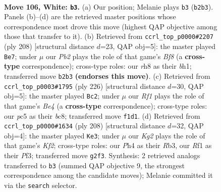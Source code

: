 \documentclass[11pt]{article}
\begin{document}
\clearpage

\begin{figure}[p]\centering
\begin{subfigure}{0.46\textwidth}\centering
\resizebox{\linewidth}{!}{%
\newchessgame
\chessboard[
  setfen={7r/2k5/p7/P1p2p1p/1p3P1P/4P1P1/1P4K1/5R2 w - - 23 106},
  showmover=false,
  pgfstyle=straightmove, color=movearrow, markmove={b2-b3}
]}
\caption{}
\end{subfigure}\hfill
\begin{subfigure}{0.46\textwidth}\centering
\resizebox{\linewidth}{!}{%
\newchessgame
\chessboard[
  setfen={5B2/5p1p/4p3/4PpP1/p4P2/P2k2P1/5K2/7b w - - 90 105},
  showmover=false,
  pgfstyle=straightmove, color=movearrow, markmove={f8-e7}
]}
\caption{}
\end{subfigure}
\\[4pt]
\begin{subfigure}{0.46\textwidth}\centering
\resizebox{\linewidth}{!}{%
\newchessgame
\chessboard[
  setfen={2b5/p4p2/1p1k2p1/7p/1P2BP1P/P3K1P1/8/8 w - - 55 114},
  showmover=false,
  pgfstyle=straightmove, color=movearrow, markmove={e4-c2}
]}
\caption{}
\end{subfigure}\hfill
\begin{subfigure}{0.46\textwidth}\centering
\resizebox{\linewidth}{!}{%
\newchessgame
\chessboard[
  setfen={8/2p5/3p2pk/3Pp1p1/2P1P3/1R3P1P/r4K2/8 w - - 27 105},
  showmover=false,
  pgfstyle=straightmove, color=movearrow, markmove={f2-e3}
]}
\caption{}
\end{subfigure}
\caption{\textbf{Move 106, White: \texttt{b3}.} (a) Our position; Melanie plays \texttt{b3} (\texttt{b2b3}). Panels (b)--(d) are the retrieved master positions whose correspondence most drove this move (highest QAP objective among those that transfer to it). (b) Retrieved from \texttt{ccrl\_top\_p0000\#2207} (ply 208) [structural distance $d$=23, QAP obj=5]: the master played \texttt{Be7}; under $\mu$ our \emph{Pb2} plays the role of that game's \emph{Bf8} (a \textbf{cross-type} correspondence); cross-type roles: our \emph{r}h8 as their \emph{b}h1; transferred move \texttt{b2b3} \textbf{(endorses this move)}. (c) Retrieved from \texttt{ccrl\_top\_p0003\#1795} (ply 226) [structural distance $d$=30, QAP obj=5]: the master played \texttt{Bc2}; under $\mu$ our \emph{Rf1} plays the role of that game's \emph{Be4} (a \textbf{cross-type} correspondence); cross-type roles: our \emph{p}c5 as their \emph{b}c8; transferred move \texttt{f1d1}. (d) Retrieved from \texttt{ccrl\_top\_p0000\#1634} (ply 208) [structural distance $d$=32, QAP obj=4]: the master played \texttt{Ke3}; under $\mu$ our \emph{Kg2} plays the role of that game's \emph{Kf2}; cross-type roles: our \emph{P}h4 as their \emph{R}b3, our \emph{R}f1 as their \emph{P}f3; transferred move \texttt{g2f3}. Synthesis: 2 retrieved analogs transferred to \texttt{b3} (summed QAP objective 9, the strongest correspondence among the candidate moves); Melanie committed it via the \texttt{search} selector.}
\label{fig:thought-m210}
\end{figure}
\end{document}
